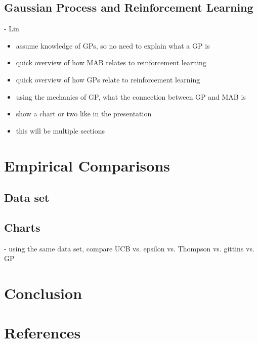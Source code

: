 \documentclass{article}
\begin{document}
\subsection{Gaussian Process and Reinforcement Learning}

- Lin
\begin{itemize}
\item assume knowledge of GPs, so no need to explain what a GP is
\item quick overview of how MAB relates to reinforcement learning
\item quick overview of how GPs relate to reinforcement learning
\item using the mechanics of GP, what the connection between GP and MAB is
\item show a chart or two like in the presentation
\item this will be multiple sections
\end{itemize}

\section{Empirical Comparisons}

\subsection{Data set}

\subsection{Charts}

- using the same data set, compare UCB vs. epsilon vs. Thompson vs. gittins vs. GP

\section{Conclusion}

\section{References}
\end{document}
